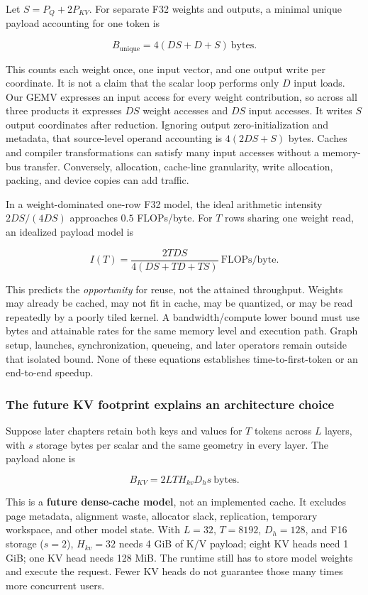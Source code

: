 \documentclass[
  10pt,
]{article}
\begin{document}
Let \(S=P_Q+2P_{KV}\). For separate F32 weights and outputs, a minimal
unique payload accounting for one token is

\[
B_{\mathrm{unique}}=4(DS+D+S)\ \text{bytes}.
\]

This counts each weight once, one input vector, and one output write per
coordinate. It is not a claim that the scalar loop performs only \(D\)
input loads. Our GEMV expresses an input access for every weight
contribution, so across all three products it expresses \(DS\) weight
accesses and \(DS\) input accesses. It writes \(S\) output coordinates
after reduction. Ignoring output zero-initialization and metadata, that
source-level operand accounting is \(4(2DS+S)\) bytes. Caches and
compiler transformations can satisfy many input accesses without a
memory-bus transfer. Conversely, allocation, cache-line granularity,
write allocation, packing, and device copies can add traffic.

In a weight-dominated one-row F32 model, the ideal arithmetic intensity
\(2DS/(4DS)\) approaches \(0.5\) FLOPs/byte. For \(T\) rows sharing one
weight read, an idealized payload model is

\[
I(T)=\frac{2TDS}{4(DS+TD+TS)}\ \text{FLOPs/byte}.
\]

This predicts the \emph{opportunity} for reuse, not the attained
throughput. Weights may already be cached, may not fit in cache, may be
quantized, or may be read repeatedly by a poorly tiled kernel. A
bandwidth/compute lower bound must use bytes and attainable rates for
the same memory level and execution path. Graph setup, launches,
synchronization, queueing, and later operators remain outside that
isolated bound. None of these equations establishes time-to-first-token
or an end-to-end speedup.

\subsubsection{The future KV footprint explains an architecture
choice}\label{the-future-kv-footprint-explains-an-architecture-choice}

Suppose later chapters retain both keys and values for \(T\) tokens
across \(L\) layers, with \(s\) storage bytes per scalar and the same
geometry in every layer. The payload alone is

\[
B_{KV}=2LTH_{kv}D_hs\ \text{bytes}.
\]

This is a \textbf{future dense-cache model}, not an implemented cache.
It excludes page metadata, alignment waste, allocator slack,
replication, temporary workspace, and other model state. With \(L=32\),
\(T=8192\), \(D_h=128\), and F16 storage (\(s=2\)), \(H_{kv}=32\) needs
4 GiB of K/V payload; eight KV heads need 1 GiB; one KV head needs 128
MiB. The runtime still has to store model weights and execute the
request. Fewer KV heads do not guarantee those many times more
concurrent users.
\end{document}
